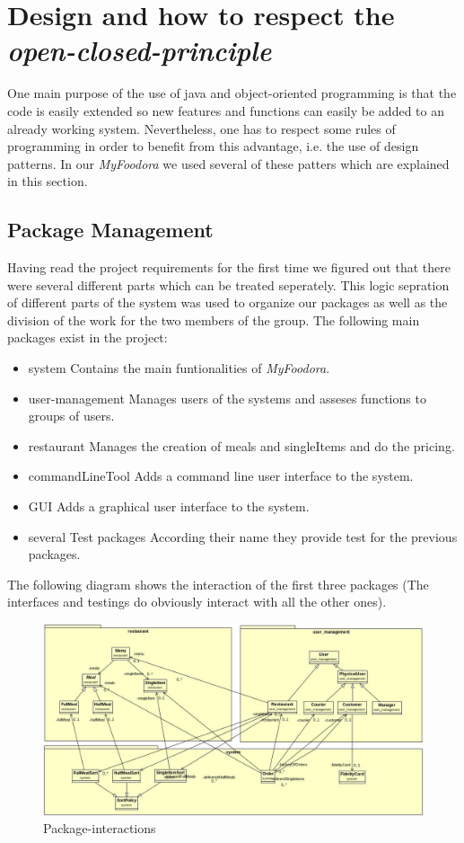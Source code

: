 \section{Design and how to respect the \textit{open-closed-principle}}
One main purpose of the use of java and object-oriented programming is that the code is easily extended so
new features and functions can easily be added to an already working system. Nevertheless, one has to 
respect some rules of programming in order to benefit from this advantage, i.e. the use of design patterns.
In our \textit{MyFoodora} we used several of these patters which are explained in this section.
\subsection{Package Management}
\label{sub:package_management}

Having read the project requirements for the first time we figured out that there were several different 
parts which can be treated seperately. This logic sepration of different parts of the system was used 
to organize our packages as well as the division of the work for the two members of the group. The
following main packages exist in the project:
\begin{itemize}
	\item{system} Contains the main funtionalities of \textit{MyFoodora}.
	\item{user-management} Manages users of the systems and asseses functions to groups of users.
	\item{restaurant} Manages the creation of meals and singleItems and do the pricing.
	\item{commandLineTool} Adds a command line user interface to the system.
	\item{GUI} Adds a graphical user interface to the system.
	\item{several Test packages} According their name they provide test for the previous packages.
\end{itemize}

The following diagram shows the interaction of the first three packages (The interfaces and testings 
do obviously interact with all the other ones).

\begin{figure}[h]
	\centering
	\includegraphics[width=0.8\linewidth]{./packages.jpg}
	\caption{Package-interactions}
	\label{fig:packages}
\end{figure}
